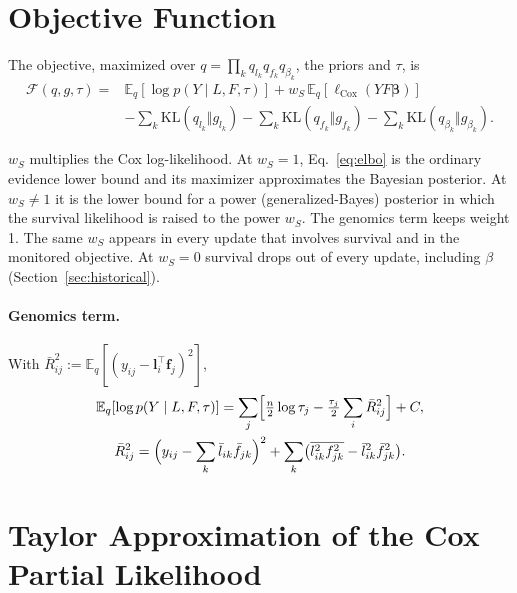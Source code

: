 \documentclass[11pt]{article}
\newcommand{\lbar}[2]{\bar{l}_{#1#2}}
\newcommand{\fbar}[2]{\bar{f}_{#1#2}}
\newcommand{\lsec}[2]{\overline{l^2_{#1#2}}}
\newcommand{\fsec}[2]{\overline{f^2_{#1#2}}}
\newcommand{\E}{\mathbb{E}_q}
\newcommand{\KL}{\mathrm{KL}}
\newcommand{\ws}{w_S}
\begin{document}
\section{Objective Function}\label{sec:elbo}

The objective, maximized over $q = \prod_k q_{l_k}q_{f_k}q_{\beta_k}$, the priors
and $\tau$, is
\begin{equation}\label{eq:elbo}
\begin{split}
  \mathcal{F}(q, g, \tau) ={}&
  \E\!\left[\log p(Y\mid L,F,\tau)\right]
  + \ws\,\E\!\left[\ell_{\text{Cox}}(YF\bm{\beta})\right]\\
  &- \sum_k \KL(q_{l_k}\Vert g_{l_k})
  - \sum_k \KL(q_{f_k}\Vert g_{f_k})
  - \sum_k \KL(q_{\beta_k}\Vert g_{\beta_k}).
\end{split}
\end{equation}

\begin{keybox}
$\ws$ multiplies the Cox log-likelihood. At $\ws = 1$, Eq.~\eqref{eq:elbo} is the
ordinary evidence lower bound and its maximizer approximates the Bayesian
posterior. At $\ws \ne 1$ it is the lower bound for a power (generalized-Bayes)
posterior in which the survival likelihood is raised to the power $\ws$. The
genomics term keeps weight 1. The same $\ws$ appears in every update that
involves survival and in the monitored objective. At $\ws = 0$ survival drops out
of every update, including $\beta$ (Section~\ref{sec:historical}).
\end{keybox}

\paragraph{Genomics term.} With $\bar{R}^2_{ij} := \E[(y_{ij}-\bm{l}_i^\top\bm{f}_j)^2]$,
\begin{gather}
  \E[\log p(Y\mid L,F,\tau)]
  = \sum_j\Bigl[\tfrac{n}{2}\log\tau_j - \tfrac{\tau_j}{2}\sum_i \bar{R}^2_{ij}\Bigr] + C,
  \label{eq:gen-term}\\
  \bar{R}^2_{ij} = \Bigl(y_{ij}-\sum_k\lbar{i}{k}\fbar{j}{k}\Bigr)^2
   + \sum_k\bigl(\lsec{i}{k}\fsec{j}{k}-\lbar{i}{k}^2\fbar{j}{k}^2\bigr). \nonumber
\end{gather}

\section{Taylor Approximation of the Cox Partial Likelihood}\label{sec:taylor}
\end{document}
